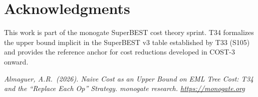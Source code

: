 \documentclass[12pt,a4paper]{article}
\theoremstyle{definition}
\begin{document}
\section*{Acknowledgments}

This work is part of the monogate SuperBEST cost theory sprint.
T34 formalizes the upper bound implicit in the SuperBEST v3 table established
by T33 (S105) and provides the reference anchor for cost reductions
developed in COST-3 onward.

\bigskip
\noindent\textit{Almaguer, A.R.\ (2026).
Naive Cost as an Upper Bound on EML Tree Cost: T34 and the ``Replace Each Op'' Strategy.
monogate research. \url{https://monogate.org}}
\end{document}
